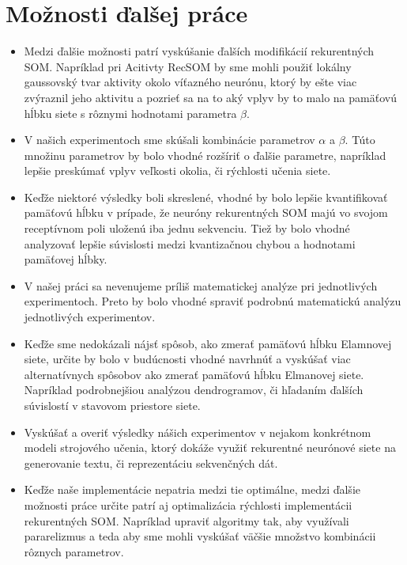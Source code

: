 \section{Možnosti ďalšej práce}
\begin{itemize}
    \item Medzi ďalšie možnosti patrí vyskúšanie ďalších modifikácií rekurentných SOM. 
    Napríklad pri Acitivty RecSOM by sme mohli použiť lokálny gaussovský tvar aktivity okolo víťazného neurónu, ktorý by ešte viac zvýraznil jeho aktivitu a pozrieť sa na to aký vplyv by to malo 
    na pamäťovú hĺbku siete s rôznymi hodnotami parametra $\beta$.
    \item V našich experimentoch sme skúšali kombinácie parametrov $\alpha$ a $\beta$. Túto množinu parametrov by bolo vhodné rozšíriť o ďalšie parametre, napríklad
    lepšie preskúmať vplyv veľkosti okolia, či rýchlosti učenia siete.
    \item Keďže niektoré výsledky boli skreslené, vhodné by bolo lepšie kvantifikovať pamäťovú hĺbku v prípade, že neuróny rekurentných SOM majú vo svojom
    receptívnom poli uloženú iba jednu sekvenciu. 
    Tiež by bolo vhodné analyzovať lepšie súvislosti medzi kvantizačnou chybou a hodnotami pamäťovej hĺbky.
    \item V našej práci sa nevenujeme príliš matematickej analýze pri jednotlivých experimentoch.
    Preto by bolo vhodné spraviť podrobnú matematickú analýzu jednotlivých experimentov.
    \item Keďže sme nedokázali nájsť spôsob, ako zmerať pamäťovú hĺbku Elamnovej siete, určite by bolo 
    v budúcnosti vhodné navrhnúť a vyskúšať viac alternatívnych spôsobov ako zmerať pamäťovú hĺbku Elmanovej siete. 
    Napríklad podrobnejšiou analýzou dendrogramov, či hľadaním ďalších súvislostí v stavovom priestore siete.
    \item Vyskúšať a overiť výsledky nášich experimentov v nejakom konkrétnom modeli strojového učenia, ktorý dokáže 
    využiť rekurentné neurónové siete na generovanie textu, či reprezentáciu sekvenčných dát.
    \item Keďže naše implementácie nepatria medzi tie optimálne, medzi ďalšie možnosti práce
    určite patrí aj optimalizácia rýchlosti implementácii rekurentných SOM. Napríklad upraviť algoritmy tak, aby využívali
    pararelizmus a teda aby sme mohli vyskúšať väčšie množstvo kombinácii rôznych parametrov.
\end{itemize}





